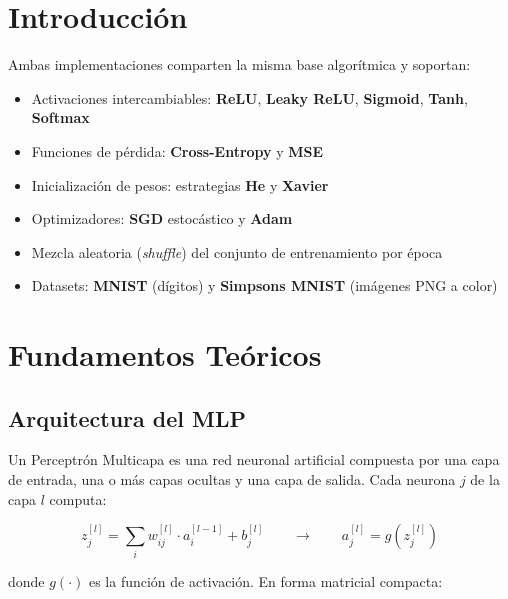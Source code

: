 \section{Introducción}

Ambas implementaciones comparten la misma base algorítmica
y soportan:

\begin{itemize}[noitemsep]
    \item Activaciones intercambiables: \textbf{ReLU}, \textbf{Leaky ReLU}, \textbf{Sigmoid}, \textbf{Tanh}, \textbf{Softmax}
    \item Funciones de pérdida: \textbf{Cross-Entropy} y \textbf{MSE}
    \item Inicialización de pesos: estrategias \textbf{He} y \textbf{Xavier}
    \item Optimizadores: \textbf{SGD} estocástico y \textbf{Adam}
    \item Mezcla aleatoria (\textit{shuffle}) del conjunto de entrenamiento por época
    \item Datasets: \textbf{MNIST} (dígitos) y \textbf{Simpsons MNIST} (imágenes PNG a color)
\end{itemize}

\section{Fundamentos Teóricos}

\subsection{Arquitectura del MLP}

Un Perceptrón Multicapa es una red neuronal artificial compuesta por una capa de entrada,
una o más capas ocultas y una capa de salida. Cada neurona $j$ de la capa $l$ computa:

\begin{equation}
    z_j^{[l]} = \sum_{i} w_{ij}^{[l]} \cdot a_i^{[l-1]} + b_j^{[l]}
    \qquad \longrightarrow \qquad
    a_j^{[l]} = g\!\left(z_j^{[l]}\right)
\end{equation}

donde $g(\cdot)$ es la función de activación. En forma matricial compacta:

